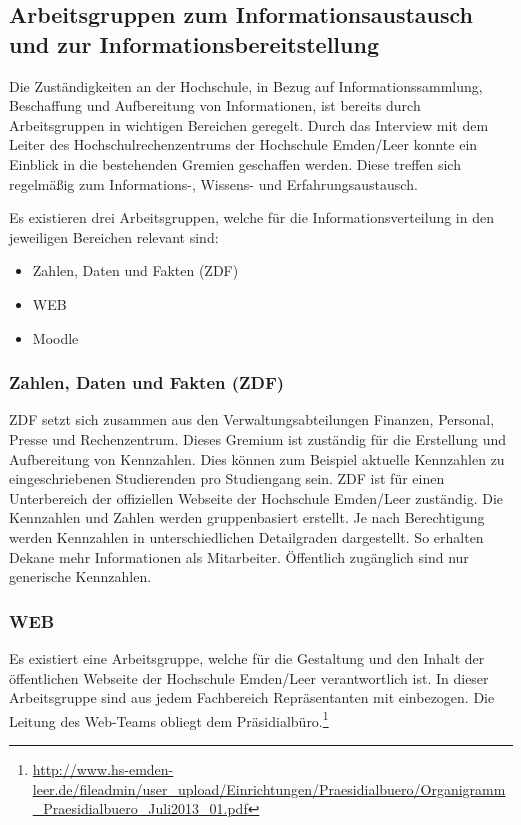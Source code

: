 \subsection{Arbeitsgruppen zum Informationsaustausch und zur Informationsbereitstellung}
\label{subsection_arbeitsgruppen_informationsaustausch}
Die Zuständigkeiten an der Hochschule, in Bezug auf Informationssammlung, Beschaffung und Aufbereitung von Informationen, ist bereits durch Arbeitsgruppen in wichtigen Bereichen geregelt. Durch das Interview mit dem Leiter des Hochschulrechenzentrums der Hochschule Emden/Leer konnte ein Einblick in die bestehenden Gremien geschaffen werden. Diese treffen sich regelmäßig zum Informations-, Wissens- und Erfahrungsaustausch.

Es existieren drei Arbeitsgruppen, welche für die Informationsverteilung in den jeweiligen Bereichen relevant sind:

\begin{itemize}
	\item Zahlen, Daten und Fakten (ZDF)
	\item WEB
	\item Moodle
\end{itemize}

\subsubsection{Zahlen, Daten und Fakten (ZDF)}
ZDF setzt sich zusammen aus den Verwaltungsabteilungen Finanzen, Personal, Presse und Rechenzentrum. Dieses Gremium ist zuständig für die Erstellung und Aufbereitung von Kennzahlen. Dies können zum Beispiel aktuelle Kennzahlen zu eingeschriebenen Studierenden pro Studiengang sein.  ZDF ist für einen Unterbereich der offiziellen Webseite der Hochschule Emden/Leer zuständig. Die Kennzahlen und Zahlen werden gruppenbasiert erstellt. Je nach Berechtigung werden Kennzahlen in unterschiedlichen Detailgraden dargestellt. So erhalten Dekane mehr Informationen als Mitarbeiter. Öffentlich zugänglich sind nur generische Kennzahlen. 

\subsubsection{WEB}
Es existiert eine Arbeitsgruppe, welche für die Gestaltung und den Inhalt der öffentlichen Webseite der Hochschule Emden/Leer verantwortlich ist. In dieser Arbeitsgruppe sind aus jedem Fachbereich Repräsentanten mit einbezogen. Die Leitung des Web-Teams obliegt dem Präsidialbüro.\footnote{\url{http://www.hs-emden-leer.de/fileadmin/user_upload/Einrichtungen/Praesidialbuero/Organigramm_Praesidialbuero_Juli2013_01.pdf}}

